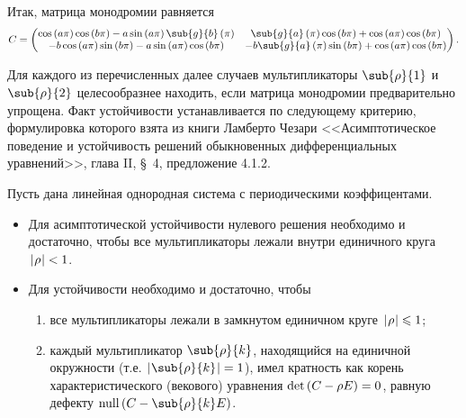 \documentclass[a5paper,10pt]{article}
\begin{document}
Итак, матрица монодромии равняется
\begin{align*}
    C = \begin{pmatrix} 
        \cos\br{a\pi} \cos\br{b\pi} - a \sin\br{a\pi} \sub{g}{b}\br{\pi}
        &  \sub{g}{a}\br{\pi} \cos\br{b\pi} + \cos\br{a\pi} \cos\br{b\pi}
        \\ -b \cos\br{a\pi} \sin\br{b\pi} - a \sin\br{a\pi} \cos\br{b\pi}
        & -b \sub{g}{a}\br{\pi} \sin\br{b\pi} + \cos\br{a\pi} \cos\br{b\pi}
    \end{pmatrix}.
\end{align*}

Для каждого из перечисленных далее случаев мультипликаторы 
$\sub{\rho}{1}$ и $\sub{\rho}{2}$ целесообразнее находить,
если матрица монодромии предварительно упрощена. 
Факт устойчивости устанавливается по следующему критерию, формулировка которого 
взята из книги Ламберто Чезари <<Асимптотическое поведение и устойчивость решений 
обыкновенных дифференциальных уравнений>>, глава II, \S\ 4, предложение 4.1.2.

\begin{framed}
    \begin{criteria} \end{criteria}
    Пусть дана линейная однородная система с периодическими коэффицентами.
    \begin{itemize}
        \item Для асимптотической устойчивости нулевого решения необходимо и достаточно,
            чтобы все мультипликаторы лежали внутри единичного круга $\hspace{0.2mm}\left|\hspace{0.06em}\rho\hspace{0.06em}\right| < 1$.
        \item Для устойчивости необходимо и достаточно, чтобы
        \begin{enumerate}
            \item все мультипликаторы лежали в замкнутом единичном круге $\hspace{0.2mm}\left|\hspace{0.06em}\rho\hspace{0.06em}\right| \leqslant 1$;
            \item каждый мультипликатор $\sub{\rho}{k}$,
            находящийся на единичной окружности \linebreak (т.е. $\vbr{\sub{\rho}{k}} = 1$), 
            имел кратность как корень характеристического (векового) \linebreak уравнения 
            $\det\left(\hspace{0.01em}C - \rho E\hspace{0.01em}\right) = 0$, равную дефекту $\nullity\br{C - \sub{\rho}{k} E}$.
        \end{enumerate}
    \end{itemize}
\end{framed}
\end{document}
